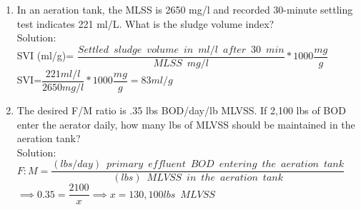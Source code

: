 \begin{enumerate}
\item In an aeration tank, the MLSS is 2650 mg/l and recorded 30-minute settling test indicates 221 ml/L.  What is the sludge volume index?\\
\vspace{0.3cm}
Solution:\\
SVI (ml/g)= $\dfrac{Settled \enspace sludge \enspace volume \enspace in \enspace ml/l \enspace after \enspace 30 \enspace min}{MLSS \enspace mg/l}*1000 \dfrac{mg}{g}$\\
\vspace{0.25cm}
SVI=$\dfrac{221ml/l}{2650mg/l}*1000\dfrac{mg}{g}=\boxed{83ml/g}$
\item The desired F/M ratio is .35 lbs BOD/day/lb MLVSS. If 2,100 lbs of BOD enter the aerator daily, how many lbs of MLVSS should be maintained in the aeration tank?\\
Solution:\\
$F:M=\dfrac{(lbs/day) \enspace primary \enspace effluent  \enspace BOD \enspace entering \enspace the  \enspace aeration \enspace tank}{(lbs) \enspace MLVSS \enspace in \enspace the  \enspace aeration \enspace tank}$\\
\vspace{0.3cm}
$\implies 0.35=\dfrac{2100}{x}\implies x = \boxed{130,100lbs \enspace MLVSS}$\\


\end{enumerate}
